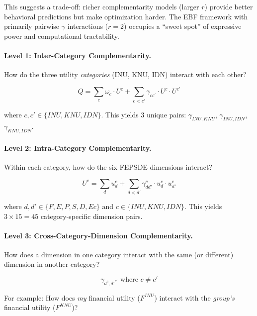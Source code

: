 This suggests a trade-off: richer complementarity models (larger $r$) provide better 
behavioral predictions but make optimization harder. The EBF framework with 
primarily pairwise $\gamma$ interactions ($r = 2$) occupies a ``sweet spot'' of 
expressive power and computational tractability.



\paragraph{Level 1: Inter-Category Complementarity.}
How do the three utility \emph{categories} (INU, KNU, IDN) interact with each other?

\begin{equation}
Q = \sum_{c} \omega_c \cdot U^c + \sum_{c < c'} \gamma_{cc'} \cdot U^c \cdot U^{c'}
\end{equation}

where $c, c' \in \{INU, KNU, IDN\}$. This yields 3 unique pairs:
$\gamma_{INU,KNU}$, $\gamma_{INU,IDN}$, $\gamma_{KNU,IDN}$.

\paragraph{Level 2: Intra-Category Complementarity.}
Within each category, how do the six FEPSDE dimensions interact?

\begin{equation}
U^c = \sum_{d} u^c_d + \sum_{d < d'} \gamma^c_{dd'} \cdot u^c_d \cdot u^c_{d'}
\end{equation}

where $d, d' \in \{F, E, P, S, D, Ec\}$ and $c \in \{INU, KNU, IDN\}$.
This yields $3 \times 15 = 45$ category-specific dimension pairs.

\paragraph{Level 3: Cross-Category-Dimension Complementarity.}
How does a dimension in one category interact with the same (or different) 
dimension in another category?

\begin{equation}
\gamma_{d^c, d'^{c'}} \text{ where } c \neq c'
\end{equation}

For example: How does \emph{my} financial utility ($F^{INU}$) interact with 
the \emph{group's} financial utility ($F^{KNU}$)?

